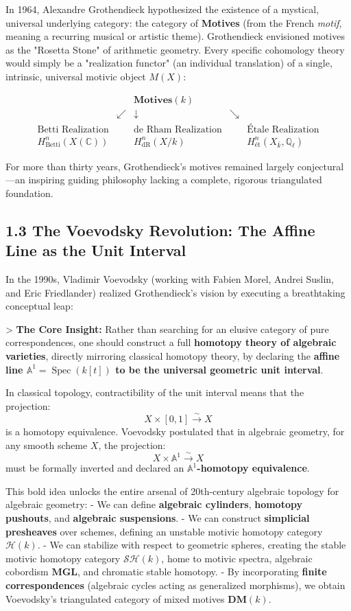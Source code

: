 \documentclass[11pt,twoside,openright]{amsbook}
\begin{document}
{In 1964, Alexandre Grothendieck hypothesized the existence of a mystical, universal underlying category: the category of \textbf{Motives} (from the French \textit{motif}, meaning a recurring musical or artistic theme). Grothendieck envisioned motives as the "Rosetta Stone" of arithmetic geometry. Every specific cohomology theory would simply be a "realization functor" (an individual translation) of a single, intrinsic, universal motivic object $M(X)$:

$$\begin{array}{ccccc}
 & & \mathbf{Motives}(k) & & \\
 & \swarrow & \downarrow & \searrow & \\
\text{Betti Realization} & & \text{de Rham Realization} & & \text{\'Etale Realization} \\
H^n_{\mathrm{Betti}}(X(\mathbb{C})) & & H^n_{\mathrm{dR}}(X/k) & & H^n_{\text{\'et}}(X_{\bar{k}}, \mathbb{Q}_\ell)
\end{array}$$

For more than thirty years, Grothendieck's motives remained largely conjectural—an inspiring guiding philosophy lacking a complete, rigorous triangulated foundation.

\subsection{1.3 The Voevodsky Revolution: The Affine Line as the Unit Interval}
In the 1990s, Vladimir Voevodsky (working with Fabien Morel, Andrei Suslin, and Eric Friedlander) realized Grothendieck's vision by executing a breathtaking conceptual leap:

> \textbf{The Core Insight:} Rather than searching for an elusive category of pure correspondences, one should construct a full \textbf{homotopy theory of algebraic varieties}, directly mirroring classical homotopy theory, by declaring the \textbf{affine line $\mathbb{A}^1 = \operatorname{Spec}(k[t])$ to be the universal geometric unit interval}.

In classical topology, contractibility of the unit interval means that the projection:
$$X \times [0, 1] \overset{\sim}{\longrightarrow} X$$
is a homotopy equivalence. Voevodsky postulated that in algebraic geometry, for any smooth scheme $X$, the projection:
$$X \times \mathbb{A}^1 \overset{\sim}{\longrightarrow} X$$
must be formally inverted and declared an \textbf{$\mathbb{A}^1$-homotopy equivalence}.

This bold idea unlocks the entire arsenal of 20th-century algebraic topology for algebraic geometry:
- We can define \textbf{algebraic cylinders}, \textbf{homotopy pushouts}, and \textbf{algebraic suspensions}.
- We can construct \textbf{simplicial presheaves} over schemes, defining an unstable motivic homotopy category $\mathcal{H}(k)$.
- We can stabilize with respect to geometric spheres, creating the stable motivic homotopy category $\mathcal{SH}(k)$, home to motivic spectra, algebraic cobordism $\mathbf{MGL}$, and chromatic stable homotopy.
- By incorporating \textbf{finite correspondences} (algebraic cycles acting as generalized morphisms), we obtain Voevodsky's triangulated category of mixed motives $\mathbf{DM}(k)$.

}
\end{document}
